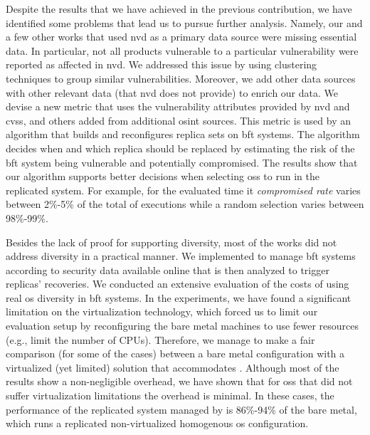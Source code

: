 Despite the results that we have achieved in the previous contribution, we have identified some problems that lead us to pursue further analysis.
Namely, our and a few other works that used \gls{nvd} as a primary data source were missing essential data. 
In particular, not all products vulnerable to a particular vulnerability were reported as affected in \gls{nvd}.
We addressed this issue by using clustering techniques to group similar vulnerabilities.
Moreover, we add other data sources with other relevant data (that \gls{nvd} does not provide) to enrich our data.
We devise a new metric that uses the vulnerability attributes provided by \gls{nvd} and \gls{cvss}, and others added from additional \gls{osint} sources. 
This metric is used by an algorithm that builds and reconfigures replica sets on \gls{bft} systems.
The algorithm decides when and which replica should be replaced by estimating the risk of the \gls{bft} system being vulnerable and potentially compromised.
The results show that our algorithm supports better decisions when selecting \glspl{os} to run in the replicated system. 
For example, for the evaluated time it \emph{compromised rate} varies between 2\%-5\% of the total of executions while a random selection varies between 98\%-99\%.
 

Besides the lack of proof for supporting diversity, most of the works did not address diversity in a practical manner.
We implemented \system to manage \gls{bft} systems according to security data available online that is then analyzed to trigger replicas' recoveries.
We conducted an extensive evaluation of the costs of using real \gls{os} diversity in \gls{bft} systems.
In the experiments, we have found a significant limitation on the virtualization technology, which forced us to limit our evaluation setup by reconfiguring the bare metal machines to use fewer resources (e.g., limit the number of CPUs).
Therefore, we manage to make a fair comparison (for some of the cases) between a bare metal configuration with a virtualized (yet limited) solution that accommodates \system.
Although most of the results show a non-negligible overhead, we have shown that for \glspl{os} that did not suffer virtualization limitations the overhead is minimal.
In these cases, the performance of the replicated system managed by \system is 86\%-94\% of the bare metal, which runs a replicated non-virtualized homogenous \gls{os} configuration.

